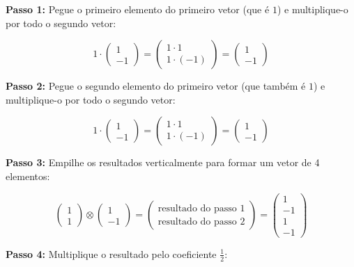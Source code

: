 \documentclass[
  brazilian,
]{report}
\begin{document}
\textbf{Passo 1:} Pegue o primeiro elemento do primeiro vetor (que é
\(1\)) e multiplique-o por todo o segundo vetor:

\[1 \cdot \begin{pmatrix} 1 \\ -1 \end{pmatrix} = \begin{pmatrix} 1 \cdot 1 \\ 1 \cdot (-1) \end{pmatrix} = \begin{pmatrix} 1 \\ -1 \end{pmatrix}\]

\textbf{Passo 2:} Pegue o segundo elemento do primeiro vetor (que também
é \(1\)) e multiplique-o por todo o segundo vetor:

\[1 \cdot \begin{pmatrix} 1 \\ -1 \end{pmatrix} = \begin{pmatrix} 1 \cdot 1 \\ 1 \cdot (-1) \end{pmatrix} = \begin{pmatrix} 1 \\ -1 \end{pmatrix}\]

\textbf{Passo 3:} Empilhe os resultados verticalmente para formar um
vetor de 4 elementos:

\[\begin{pmatrix} 1 \\ 1 \end{pmatrix} \otimes \begin{pmatrix} 1 \\ -1 \end{pmatrix} = \begin{pmatrix} \text{resultado do passo 1} \\ \text{resultado do passo 2} \end{pmatrix} = \begin{pmatrix} 1 \\ -1 \\ 1 \\ -1 \end{pmatrix}\]

\textbf{Passo 4:} Multiplique o resultado pelo coeficiente
\(\frac{1}{2}\):
\end{document}
